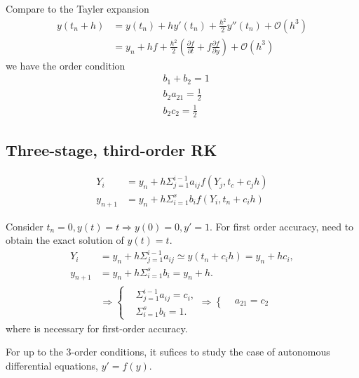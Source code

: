 \documentclass[prd,aps,a4paper,superscriptaddress,onecolumn,footinbib]{revtex4}
\begin{document}
Compare to the Tayler expansion
\begin{align}
    y(t_n+h)
    &=y(t_n) + hy'(t_n) + \frac{h^2}{2}y''(t_n)
    + \mathcal{O}(h^3)
    \\
    &=y_n + h f + \frac{h^2}{2} \left(\frac{\partial f}{\partial t}+f\frac{\partial f}{\partial y}\right)
    + \mathcal{O}(h^3)
\end{align}
we have the order condition
\begin{align}
    &b_1+b_2 = 1 \\
    &b_2a_{21} = \frac{1}{2} \\
    &b_2c_2 = \frac{1}{2}
\end{align}

\subsection{Three-stage, third-order RK}

\begin{align}
    Y_i
    &= y_n + h \Sigma_{j=1}^{i-1}a_{ij}f(Y_j, t_c+c_jh)
    \\
    y_{n+1}
    &=y_n + h \Sigma_{i=1}^{s}b_i f(Y_i, t_n+c_ih)
\end{align}

Consider $t_n=0, y(t)=t \Rightarrow y(0)=0, y'=1$. For first order accuracy, need to obtain the exact
solution of $y(t)=t$.
\begin{align}
    Y_i
    &=y_n+h\Sigma_{j=1}^{i-1} a_{ij} \simeq y(t_n+c_ih) = y_n+hc_i, \\
    y_{n+1}
    &=y_n + h\Sigma_{i=1}^sb_i = y_n + h.
\end{align}
\begin{align}
    &\Rightarrow
    \left\{
        \begin{matrix}
            &\Sigma_{j=1}^{i-1}a_{ij} = c_i, \\
            &\Sigma_{i=1}^sb_i = 1.
        \end{matrix}
    \right.
    \Rightarrow
    \left\{
        \begin{matrix}
            &a_{21} = c_2
        \end{matrix}
    \right.
\end{align}
where is necessary for first-order accuracy.

For up to the 3-order conditions, it sufices to study the case of autonomous differential
equations, $y'=f(y)$.
\end{document}
